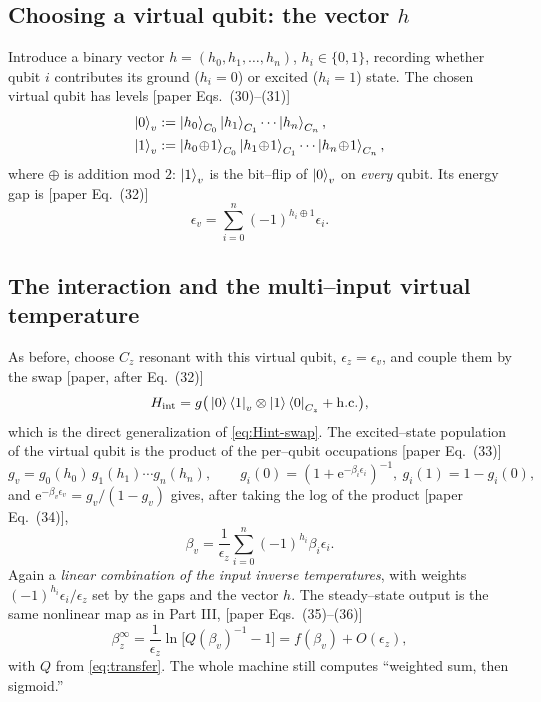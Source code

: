 \documentclass[11pt,a4paper]{article}
\newcommand{\ee}{\mathrm{e}}
\theoremstyle{definition}
\theoremstyle{remark}
\begin{document}
\subsection{Choosing a virtual qubit: the vector $h$}
Introduce a binary vector $h=(h_0,h_1,\dots,h_n)$, $h_i\in\{0,1\}$,
recording whether qubit $i$ contributes its ground ($h_i=0$) or excited
($h_i=1$) state. The chosen virtual qubit has levels [paper
Eqs.~(30)--(31)]
\begin{align}
\ket{0}_v &:= \ket{h_0}_{C_0}\ket{h_1}_{C_1}\cdots\ket{h_n}_{C_n},\\
\ket{1}_v &:= \ket{h_0\!\oplus\!1}_{C_0}\ket{h_1\!\oplus\!1}_{C_1}
\cdots\ket{h_n\!\oplus\!1}_{C_n},
\end{align}
where $\oplus$ is addition mod $2$: $\ket{1}_v$ is the bit--flip of
$\ket{0}_v$ on \emph{every} qubit. Its energy gap is [paper Eq.~(32)]
\begin{equation}
\epsilon_v = \sum_{i=0}^{n}(-1)^{h_i\oplus1}\epsilon_i .
\label{eq:eps-v-gen}
\end{equation}

\subsection{The interaction and the multi--input virtual temperature}
As before, choose $C_z$ resonant with this virtual qubit,
$\epsilon_z=\epsilon_v$, and couple them by the swap [paper, after
Eq.~(32)]
\begin{equation}
H_{\mathrm{int}} = g\big(\ket{0}\bra{1}_v\otimes\ket{1}\bra{0}_{C_z}
+ \mathrm{h.c.}\big),
\label{eq:Hint-gen}
\end{equation}
which is the direct generalization of \eqref{eq:Hint-swap}. The
excited--state population of the virtual qubit is the product of the
per--qubit occupations [paper Eq.~(33)]
\begin{equation}
g_v = g_0(h_0)\,g_1(h_1)\cdots g_n(h_n),\qquad
g_i(0)=(1+\ee^{-\beta_i\epsilon_i})^{-1},\ g_i(1)=1-g_i(0),
\end{equation}
and $\ee^{-\beta_v\epsilon_v}=g_v/(1-g_v)$ gives, after taking the log of
the product [paper Eq.~(34)],
\begin{equation}
\boxed{\;
\beta_v = \frac{1}{\epsilon_z}\sum_{i=0}^{n}(-1)^{h_i}\beta_i\epsilon_i .
\;}
\label{eq:betav-gen}
\end{equation}
Again a \emph{linear combination of the input inverse temperatures}, with
weights $(-1)^{h_i}\epsilon_i/\epsilon_z$ set by the gaps and the vector
$h$. The steady--state output is the same nonlinear map as in Part III,
[paper Eqs.~(35)--(36)]
\begin{equation}
\beta_z^\infty=\frac{1}{\epsilon_z}\ln\!\big[Q(\beta_v)^{-1}-1\big]
= f(\beta_v)+O(\epsilon_z),
\end{equation}
with $Q$ from \eqref{eq:transfer}. The whole machine still computes
``weighted sum, then sigmoid.''
\end{document}
